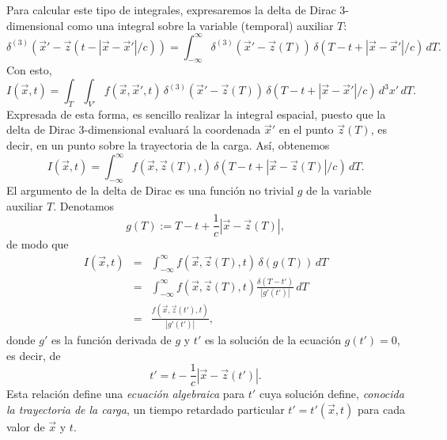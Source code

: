 Para calcular este tipo de integrales, expresaremos la delta de Dirac 3-dimensional como una integral sobre la variable (temporal) auxiliar $T$:
\begin{equation}
 \delta^{(3)}(\vec{x}'-\vec{z}(t-|\vec{x}-\vec{x}'|/c))=\int_{-\infty}^\infty \delta^{(3)}(\vec{x}'-\vec{z}(T))\,\delta(T-t+|\vec{x}-\vec{x}'|/c)\, dT.
\end{equation}
Con esto,
\begin{equation}
I(\vec{x},t)=\int_{T}\int_{V'}
f(\vec{x},\vec{x}',t)\,\delta^{(3)}(\vec{x}'-\vec{z}(T))\,\delta(T-t+|\vec{x}-\vec{x}'|/c)\,d^3x' \, dT. \label{potretqgm11}
\end{equation}
Expresada de esta forma, es sencillo realizar la integral espacial, puesto que la delta de Dirac 3-dimensional evaluará la coordenada $\vec{x}'$ en el punto $\vec{z}(T)$, es decir, en un punto sobre la trayectoria de la carga. Así, obtenemos
\begin{equation}
I(\vec{x},t)=\int_{-\infty}^\infty f(\vec{x},\vec{z}(T),t)\,\delta(T-t+|\vec{x}-\vec{z}(T)|/c)\, dT. \label{potretqgm12}
\end{equation}
El argumento de la delta de Dirac es una función no trivial $g$ de la variable auxiliar $T$. Denotamos
\begin{equation}
 g(T):=T-t+\frac{1}{c}|\vec{x}-\vec{z}(T)|,
\end{equation}
de modo que
\begin{eqnarray}
I(\vec{x},t)&=&\int_{-\infty}^\infty f(\vec{x},\vec{z}(T),t)\,\delta(g(T))\, dT \\
&=&\int_{-\infty}^\infty f(\vec{x},\vec{z}(T),t)\frac{\delta(T-t')}{|g'(t')|}\, dT \\
&=&\frac{f(\vec{x},\vec{z}(t'),t)}{|g'(t')|}, \label{Ir}
\end{eqnarray}
donde $g'$ es la función derivada de $g$ y $t'$ es la solución de la ecuación $g(t')=0$, es decir, de
\begin{equation}
 t'=t-\frac{1}{c}|\vec{x}-\vec{z}(t')|. \label{t'}
\end{equation}
Esta relación define una \textit{ecuación algebraica} para $t'$ cuya solución define, \textit{conocida la trayectoria de la carga}, un tiempo retardado particular $t'=t'(\vec{x},t)$ para cada valor de $\vec{x}$ y $t$. 

